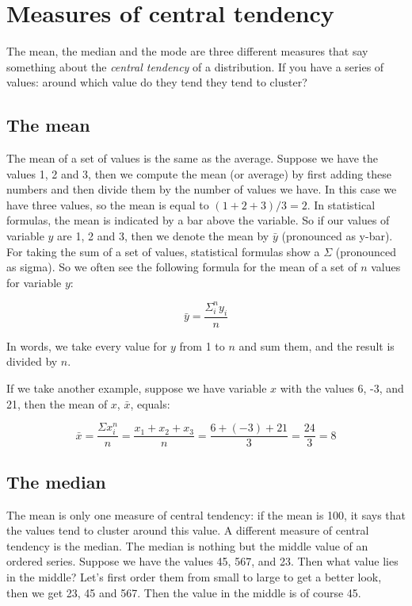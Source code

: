 \documentclass[]{report}\usepackage[]{graphicx}\usepackage[]{color}
\begin{document}
\section{Measures of central tendency}

The mean, the median and the mode are three different measures that say something about the \textit{central tendency} of a distribution. If you have a series of values: around which value do they tend they tend to cluster?

\subsection{The mean}
The mean of a set of values is the same as the average. Suppose we have the values 1, 2 and 3, then we compute the mean (or average) by first adding these numbers and then divide them by the number of values we have. In this case we have three values, so the mean is equal to $(1 + 2 + 3)/3 = 2$. In statistical formulas, the mean is indicated by a bar above the variable. So if our values of variable $y$ are 1, 2 and 3, then we denote the mean by $\bar{y}$ (pronounced as y-bar). For taking the sum of a set of values, statistical formulas show a $\Sigma$ (pronounced as sigma). So we often see the following formula for the mean of a set of $n$ values for variable $y$:

\begin{equation}
\bar{y} = \frac{\Sigma_i^n y_i}{n}
\end{equation}

In words, we take every value for $y$ from 1 to $n$ and sum them, and the result is divided by $n$.

If we take another example, suppose we have variable $x$ with the values {6, -3, and 21}, then the mean of $x$, $\bar{x}$, equals:

\begin{equation}
\bar{x} = \frac {  \Sigma x_i^n} {n} =    \frac{x_1 + x_2 + x_3}{n} = \frac{6 + (-3) + 21}{3} = \frac{24}{3} = 8
\end{equation}







\subsection{The median}
The mean is only one measure of central tendency: if the mean is 100, it says that the values tend to cluster around this value. A different measure of central tendency is the median. The median is nothing but the middle value of an ordered series. Suppose we have the values 45, 567, and 23. Then what value lies in the middle? Let's first order them from small to large to get a better look, then we get 23, 45 and 567. Then the value in the middle is of course 45.
\end{document}
